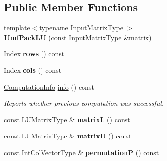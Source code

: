 \subsection*{Public Member Functions}
\begin{DoxyCompactItemize}
\item 
\mbox{\label{class_eigen_1_1_umf_pack_l_u_a3b0b5f84a7d80617dfb30346557314ee}} 
{\footnotesize template$<$typename Input\+Matrix\+Type $>$ }\\{\bfseries Umf\+Pack\+LU} (const Input\+Matrix\+Type \&matrix)
\item 
\mbox{\label{class_eigen_1_1_umf_pack_l_u_a549f558df5de7839dfba74ca9b9a2572}} 
Index {\bfseries rows} () const
\item 
\mbox{\label{class_eigen_1_1_umf_pack_l_u_aad5e5a2b1d2e450d9749ae784c3dfa16}} 
Index {\bfseries cols} () const
\item 
\mbox{\hyperlink{group__enums_ga85fad7b87587764e5cf6b513a9e0ee5e}{Computation\+Info}} \mbox{\hyperlink{class_eigen_1_1_umf_pack_l_u_a68738a0d99c67316877706f98b033402}{info}} () const
\begin{DoxyCompactList}\small\item\em Reports whether previous computation was successful. \end{DoxyCompactList}\item 
\mbox{\label{class_eigen_1_1_umf_pack_l_u_a35ae31390d7c11e9a51b573616fc65ba}} 
const \mbox{\hyperlink{class_eigen_1_1_sparse_matrix}{L\+U\+Matrix\+Type}} \& {\bfseries matrixL} () const
\item 
\mbox{\label{class_eigen_1_1_umf_pack_l_u_afcbe772b2cbf458791111ae5b648c21a}} 
const \mbox{\hyperlink{class_eigen_1_1_sparse_matrix}{L\+U\+Matrix\+Type}} \& {\bfseries matrixU} () const
\item 
\mbox{\label{class_eigen_1_1_umf_pack_l_u_aa567568176f719c536ae84bb82128aae}} 
const \mbox{\hyperlink{class_eigen_1_1_matrix}{Int\+Col\+Vector\+Type}} \& {\bfseries permutationP} () const
\item 
\mbox{\label{class_eigen_1_1_umf_pack_l_u_ac28a1e26d4dab8d1ee7c5d10e9770668}} 

\end{DoxyCompactItemize}
